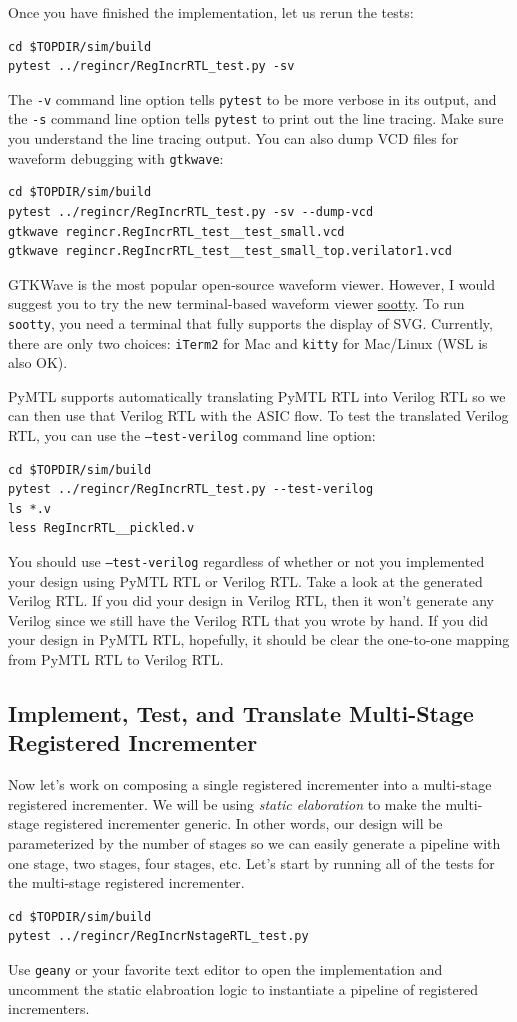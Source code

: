 \documentclass[a4paper,12pt,twoside]{article}
\begin{document}
Once you have finished the implementation, let us rerun the tests:
\begin{verbatim}
cd $TOPDIR/sim/build
pytest ../regincr/RegIncrRTL_test.py -sv
\end{verbatim}
The \texttt{-v} command line option tells \texttt{pytest} to be more verbose in its output, and the \texttt{-s} command line option tells \texttt{pytest} to print out the line tracing. Make sure you understand the line tracing output. You can also dump VCD files for waveform debugging with \texttt{gtkwave}:
\begin{verbatim}
cd $TOPDIR/sim/build
pytest ../regincr/RegIncrRTL_test.py -sv --dump-vcd
gtkwave regincr.RegIncrRTL_test__test_small.vcd
gtkwave regincr.RegIncrRTL_test__test_small_top.verilator1.vcd
\end{verbatim}
GTKWave is the most popular open-source waveform viewer. However, I would suggest you to try the new terminal-based waveform viewer \href{https://github.com/Ben1152000/sootty}{sootty}. To run \texttt{sootty}, you need a terminal that fully supports the display of SVG. Currently, there are only two choices: \texttt{iTerm2} for Mac and \texttt{kitty} for Mac/Linux (WSL is also OK).

PyMTL supports automatically translating PyMTL RTL into Verilog RTL so we can then use that Verilog RTL with the ASIC flow. To test the translated Verilog RTL, you can use the \texttt{--test-verilog} command line option:
\begin{verbatim}
cd $TOPDIR/sim/build
pytest ../regincr/RegIncrRTL_test.py --test-verilog
ls *.v
less RegIncrRTL__pickled.v
\end{verbatim}
You should use \texttt{--test-verilog} regardless of whether or not you implemented your design using PyMTL RTL or Verilog RTL. Take a look at the generated Verilog RTL. If you did your design in Verilog RTL, then it won’t generate any Verilog since we still have the Verilog RTL that you wrote by hand. If you did your design in PyMTL RTL, hopefully, it should be clear the one-to-one mapping from PyMTL RTL to Verilog RTL.
\subsection{Implement, Test, and Translate Multi-Stage Registered Incrementer}\label{SPyMTL2}
Now let’s work on composing a single registered incrementer into a multi-stage registered incrementer. We will be using \textit{static elaboration} to make the multi-stage registered incrementer generic. In other words, our design will be parameterized by the number of stages so we can easily generate a pipeline with one stage, two stages, four stages, etc. Let’s start by running all of the tests for the multi-stage registered incrementer.
\begin{verbatim}
cd $TOPDIR/sim/build
pytest ../regincr/RegIncrNstageRTL_test.py
\end{verbatim}
Use \texttt{geany} or your favorite text editor to open the implementation and uncomment the static elabroation logic to instantiate a pipeline of registered incrementers.
\end{document}
